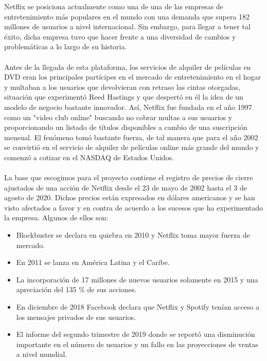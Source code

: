 
Netflix se posiciona actualmente como una de una de las empresas de entretenimiento más populares en el mundo con una demanda que supera 182 millones de usuarios a nivel internacional. Sin embargo, para llegar a tener tal éxito, dicha empresa tuvo que hacer frente a una diversidad de cambios y problemáticas a lo largo de su historia.
\\\\
Antes de la llegada de esta plataforma, los servicios de alquiler de películas en DVD eran los principales partícipes en el mercado de entretenimiento en el hogar y multaban a los usuarios que devolvieran con retraso las cintas otorgadas, situación que experimentó Reed Hastings y que despertó en él la idea de un modelo de negocio bastante innovador.
Así, Netflix fue fundada en el año 1997 como un "video club online" buscando  no cobrar multas a sus usuarios y proporcionando un listado de títulos disponibles a cambio de una suscripción mensual.
El fenómeno tomó bastante fuerza, de tal manera que para el año 2002 se convirtió en el servicio de alquiler de películas online más grande del mundo y comenzó a cotizar en el NASDAQ de Estados Unidos.
\\\\
La base que escogimos para el proyecto contiene el registro de precios de cierre ajustados de una acción de Netflix desde el 23 de mayo de 2002 hasta el 3 de agosto de 2020. Dichos precios están expresados en dólares americanos y se han visto afectados a favor y en contra de acuerdo a los sucesos que ha experimentado la empresa. Algunos de ellos son:

 

 

 \begin{multicols}{2}
    \begin{itemize}
      \item Blockbuster se declara en quiebra en 2010 y Netflix toma mayor fuerza de mercado.
      \item En 2011 se lanza en América Latina y el Caribe.
      \item La incorporación de 17 millones de nuevos usuarios solamente en 2015 y una apreciación del 135 \% de sus acciones.
       \item En diciembre de 2018 Facebook declara que Netflix y Spotify tenían acceso a los mensajes privados de sus usuarios.
      \item El informe del segundo trimestre de 2019 donde se reportó una disminución importante en el número de usuarios y un fallo en las proyecciones de ventas a nivel mundial.
    \end{itemize}
  \end{multicols}